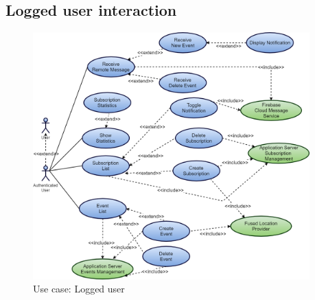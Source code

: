 \documentclass[a4paper]{scrreprt}
\begin{document}
\subsection{Logged user interaction}
\begin{figure}[H]
	\centering
	\includegraphics[width=0.95\textwidth]{diagrams/use_case/authenticated_user.png}
	\caption{Use case: Logged user}
\end{figure}
\pagebreak
\end{document}
